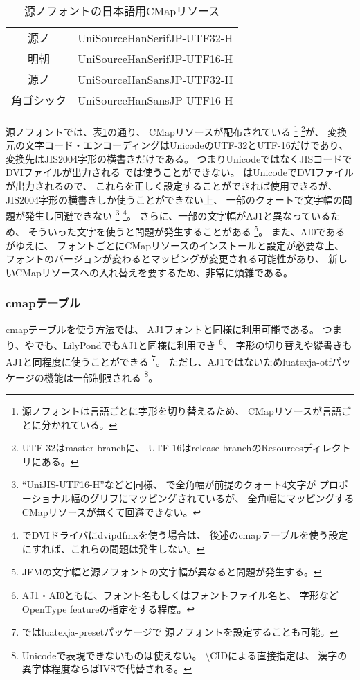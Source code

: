 \begin{table}[tb]
  \centering
  \caption{源ノフォントの日本語用CMapリソース}
  \label{tbl:sourcehan-cmap}
  \small
  \begin{tabular}{c|c}
    \hline
    源ノ & UniSourceHanSerifJP-UTF32-H \\
    \arrayrulecolor[gray]{0.7}\cline{2-2}\arrayrulecolor[gray]{0}
    明朝 & UniSourceHanSerifJP-UTF16-H \\
    \hline
    源ノ       & UniSourceHanSansJP-UTF32-H \\
    \arrayrulecolor[gray]{0.7}\cline{2-2}\arrayrulecolor[gray]{0}
    角ゴシック & UniSourceHanSansJP-UTF16-H
  \end{tabular}
\end{table}

源ノフォントでは、表\ref{tbl:sourcehan-cmap}の通り、
CMapリソースが配布されている
\footnote{源ノフォントは言語ごとに字形を切り替えるため、
  CMapリソースが言語ごとに分かれている。}%
\footnote{UTF-32はmaster branchに、
  UTF-16はrelease branchのResourcesディレクトリにある。}が、
変換元の文字コード・エンコーディングはUnicodeのUTF-32とUTF-16だけであり、
変換先はJIS2004字形の横書きだけである。
つまりUnicodeではなくJISコードでDVIファイルが出力される
\pTeX では使うことができない。
\upTeX はUnicodeでDVIファイルが出力されるので、
これらを正しく設定することができれば使用できるが、
JIS2004字形の横書きしか使うことができない上、
一部のクォートで文字幅の問題が発生し回避できない
\footnote{``UniJIS-UTF16-H''などと同様、
  \upTeX で全角幅が前提のクォート4文字が
  プロポーショナル幅のグリフにマッピングされているが、
  全角幅にマッピングするCMapリソースが無くて回避できない。}%
\footnote{\upTeX でDVIドライバにdvipdfmxを使う場合は、
  後述のcmapテーブルを使う設定にすれば、これらの問題は発生しない。}。
さらに、一部の文字幅がAJ1と異なっているため、
そういった文字を使うと問題が発生することがある
\footnote{JFMの文字幅と源ノフォントの文字幅が異なると問題が発生する。}。
また、AI0であるがゆえに、
フォントごとにCMapリソースのインストールと設定が必要な上、
フォントのバージョンが変わるとマッピングが変更される可能性があり、
新しいCMapリソースへの入れ替えを要するため、非常に煩雑である。

\subsubsection{cmapテーブル}

cmapテーブルを使う方法では、
AJ1フォントと同様に利用可能である。
つまり、\LuaTeX や\XeTeX でも、LilyPondでもAJ1と同様に利用でき
\footnote{AJ1・AI0ともに、フォント名もしくはフォントファイル名と、
  字形などOpenType featureの指定をする程度。}、
字形の切り替えや縦書きもAJ1と同程度に使うことができる
\footnote{\LuaTeX ではluatexja-presetパッケージで
  源ノフォントを設定することも可能。}。
ただし、AJ1ではないためluatexja-otfパッケージの機能は一部制限される
\footnote{Unicodeで表現できないものは使えない。
  \backslash CIDによる直接指定は、
  漢字の異字体程度ならばIVSで代替される。}。

